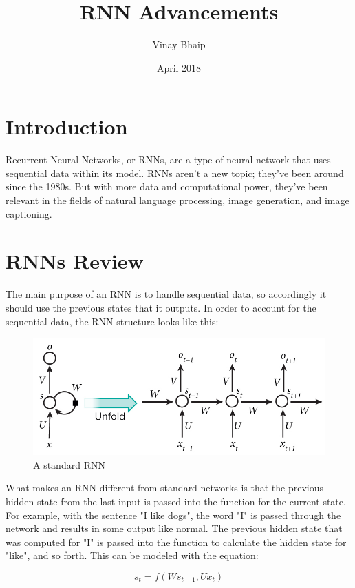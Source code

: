 \documentclass{article}
\title{RNN Advancements}
\author{Vinay Bhaip}
\date{April 2018}
\begin{document}
\maketitle

\section{Introduction}
Recurrent Neural Networks, or RNNs, are a type of neural network that uses sequential data within its model. RNNs aren't a new topic; they've been around since the 1980s. But with more data and computational power, they've been relevant in the fields of natural language processing, image generation, and image captioning.

\section{RNNs Review}

The main purpose of an RNN is to handle sequential data, so accordingly it should use the previous states that it outputs. In order to account for the sequential data, the RNN structure looks like this:


\begin{figure}[H]
\centering
\includegraphics[scale=0.4]{basic_rnn.jpg}
\caption{A standard RNN}
\label{fig:basic_rnn}
\end{figure}

What makes an RNN different from standard networks is that the previous hidden state from the last input is passed into the function for the current state. For example, with the sentence "I like dogs", the word "I" is passed through the network and results in some output like normal. The previous hidden state that was computed for "I" is passed into the function to calculate the hidden state for "like", and so forth. This can be modeled with the equation:

\begin{equation}
    s_{t} = f(Ws_{t-1},Ux_{t})
\end{equation}
\end{document}
